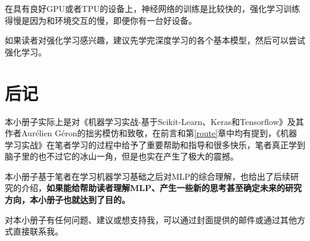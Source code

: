 \documentclass[a5paper, 11pt]{ctexbook}
\begin{document}
在具有良好GPU或者TPU的设备上，神经网络的训练是比较快的，强化学习训练得慢是因为和环境交互的慢，即便你有一台好设备。

如果读者对强化学习感兴趣，建议先学完深度学习的各个基本模型，然后可以尝试强化学习。

\chapter{后记}

本小册子实际上是对《机器学习实战-基于Scikit-Learn、Keras和Tensorflow》及其作者Aurélien Géron的拙劣模仿和致敬，在前言和第\ref{route}章中均有提到，《机器学习实战》在笔者学习的过程中给予了重要帮助和指导和很多快乐，笔者真正学到脑子里的也不过它的冰山一角，但是也实在产生了极大的震撼。

本小册子基于笔者在学习机器学习基础之后对MLP的综合理解，也给出了后续研究的介绍，\textbf{如果能给帮助读者理解MLP、产生一些新的思考甚至确定未来的研究方向，本小册子也就达到了目的。}

对本小册子有任何问题、建议或想支持我，可以通过封面提供的邮件或通过其他方式直接联系我。
\end{document}
